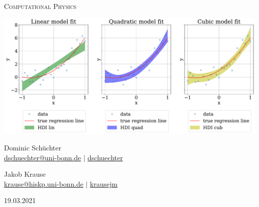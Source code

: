 \documentclass[11pt,aspectratio=1610,dvipsnames]{beamer}
\begin{document}
\begin{frame}[plain]
	\setcounter{page}{0}
	\centering
	{\Large \textsc{}}\\
	\textsc{Computational Physics}
	\vfill
	
	\includegraphics[width=0.5\linewidth]{HDI_sigma_07a}
	\vfill
	\begin{minipage}{\linewidth}
		\centering
		\begin{minipage}{0.45\linewidth}
			\centering
			Dominic Schüchter\\
			\scriptsize \href{mail:dschuechter@uni-bonn.de}{\faEnvelope  \hspace*{0.1cm}dschuechter@uni-bonn.de} {\color{black}$|$} \href{https://github.com/dschuechter}{\faGithub  \hspace*{0.1cm}dschuechter}\\
		\end{minipage}
		\begin{minipage}{0.45\linewidth}
			\centering
			Jakob Krause\\
			\scriptsize \href{mail:krause@hiskp.uni-bonn.de}{\faEnvelope  \hspace*{0.1cm}krause@hiskp.uni-bonn.de} {\color{black}$|$} \href{https://github.com/krausejm}{\faGithub  \hspace*{0.1cm}krausejm}\\
		\end{minipage}
	\end{minipage}
	\vspace{0.5cm}
	
	19.03.2021
	 
	
 		
\end{frame}

\end{document}
